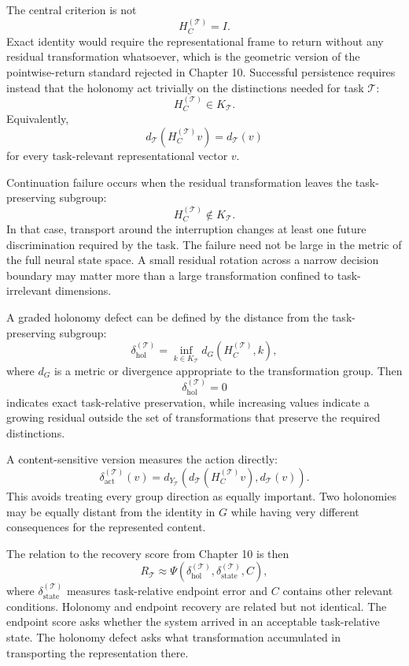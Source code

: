 \documentclass[11pt]{book}
\begin{document}
The central criterion is not
\[
H_C^{(\mathcal T)}=I.
\]
Exact identity would require the representational frame to return without any residual transformation whatsoever, which is the geometric version of the pointwise-return standard rejected in Chapter 10. Successful persistence requires instead that the holonomy act trivially on the distinctions needed for task $\mathcal T$:
\[
H_C^{(\mathcal T)}\in K_{\mathcal T}.
\]
Equivalently,
\[
d_{\mathcal T}
\!\left(
H_C^{(\mathcal T)}v
\right)
=
d_{\mathcal T}(v)
\]
for every task-relevant representational vector $v$.

Continuation failure occurs when the residual transformation leaves the task-preserving subgroup:
\[
H_C^{(\mathcal T)}\notin K_{\mathcal T}.
\]
In that case, transport around the interruption changes at least one future discrimination required by the task. The failure need not be large in the metric of the full neural state space. A small residual rotation across a narrow decision boundary may matter more than a large transformation confined to task-irrelevant dimensions.

A graded holonomy defect can be defined by the distance from the task-preserving subgroup:
\[
\delta_{\mathrm{hol}}^{(\mathcal T)}
=
\inf_{k\in K_{\mathcal T}}
d_G\!\left(
H_C^{(\mathcal T)},k
\right),
\]
where $d_G$ is a metric or divergence appropriate to the transformation group. Then
\[
\delta_{\mathrm{hol}}^{(\mathcal T)}=0
\]
indicates exact task-relative preservation, while increasing values indicate a growing residual outside the set of transformations that preserve the required distinctions.

A content-sensitive version measures the action directly:
\[
\delta_{\mathrm{act}}^{(\mathcal T)}(v)
=
d_{Y_{\mathcal T}}\!\left(
d_{\mathcal T}(H_C^{(\mathcal T)}v),
d_{\mathcal T}(v)
\right).
\]
This avoids treating every group direction as equally important. Two holonomies may be equally distant from the identity in $G$ while having very different consequences for the represented content.

The relation to the recovery score from Chapter 10 is then
\[
R_{\mathcal T}
\approx
\Psi\!\left(
\delta_{\mathrm{hol}}^{(\mathcal T)},
\delta_{\mathrm{state}}^{(\mathcal T)},
C
\right),
\]
where $\delta_{\mathrm{state}}^{(\mathcal T)}$ measures task-relative endpoint error and $C$ contains other relevant conditions. Holonomy and endpoint recovery are related but not identical. The endpoint score asks whether the system arrived in an acceptable task-relative state. The holonomy defect asks what transformation accumulated in transporting the representation there.
\end{document}
